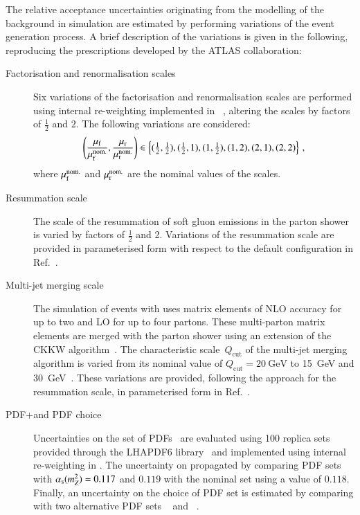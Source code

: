 The relative acceptance uncertainties originating from the modelling
of the \ZHF background in simulation are estimated by performing
variations of the event generation process. A brief description of the
variations is given in the following, reproducing the prescriptions
developed by the ATLAS collaboration:
\begin{description}

\item[Factorisation and renormalisation scales] Six variations of the
  factorisation and renormalisation scales are performed using
  internal re-weighting implemented in
  \SHERPA[2.2.1]~\cite{Bothmann:2019yzt}, altering the scales by
  factors of $\frac{1}{2}$ and $2$. The following variations are
  considered:
  \begin{align*}
    \left( \frac{\mu_\mathrm{f}}{\mu_\mathrm{f}^{\text{nom.}}}, \frac{\mu_\mathrm{r}}{\mu_\mathrm{r}^{\text{nom.}}} \right) \in
    \left\{ (\tfrac{1}{2}, \tfrac{1}{2}), (\tfrac{1}{2}, 1), (1, \tfrac{1}{2}), (1, 2), (2, 1), (2, 2) \right\} \,\text{,}
  \end{align*}
  where $\mu_\mathrm{f}^{\text{nom.}}$ and $\mu_\mathrm{r}^{\text{nom.}}$ are the nominal
  values of the scales.

\item[Resummation scale] The scale of the resummation of soft gluon
  emissions in the \SHERPA parton shower is varied by factors of
  $\frac{1}{2}$ and 2. Variations of the resummation scale are
  provided in parameterised form with respect to the default \SHERPA
  configuration in Ref.~\cite{anders:2017}.

\item[Multi-jet merging scale] The simulation of \Zjets events with
  \SHERPA[2.2.1] uses matrix elements of NLO accuracy for up to two
  and LO for up to four partons. These multi-parton matrix elements
  are merged with the parton shower using an extension of the CKKW
  algorithm~\cite{Catani:2001cc,Hoeche:2009rj,Hoeche:2012yf}. The
  characteristic scale~$Q_{\text{cut}}$ of the multi-jet merging
  algorithm is varied from its nominal value of
  $Q_{\text{cut}} = \SI{20}{\GeV}$ to \SI{15}{\GeV} and
  \SI{30}{\GeV}~\cite{anders:2017}. These variations are provided,
  following the approach for the resummation scale, in parameterised
  form in Ref.~\cite{anders:2017}.

\item[PDF+\alphas and PDF choice] Uncertainties on the \NNPDF[3.0nnlo]
  set of PDFs~\cite{Ball:2014uwa} are evaluated using 100 replica sets
  provided through the \textsc{LHAPDF6} library~\cite{Buckley:2014ana}
  and implemented using internal re-weighting in \SHERPA. The
  uncertainty on \alphas propagated by comparing \NNPDF[3.0nnlo] PDF
  sets with $\alpha_{\text{s}}(m_{Z}^2) = 0.117$ and $0.119$ with the nominal set
  using a value of $0.118$. Finally, an uncertainty on the choice of
  PDF set is estimated by comparing with two alternative PDF sets
  \MMHT[nnlo68cl]~\cite{Harland-Lang:2014zoa} and
  \CT[14nnlo]~\cite{Dulat:2015mca}.


\end{description}
